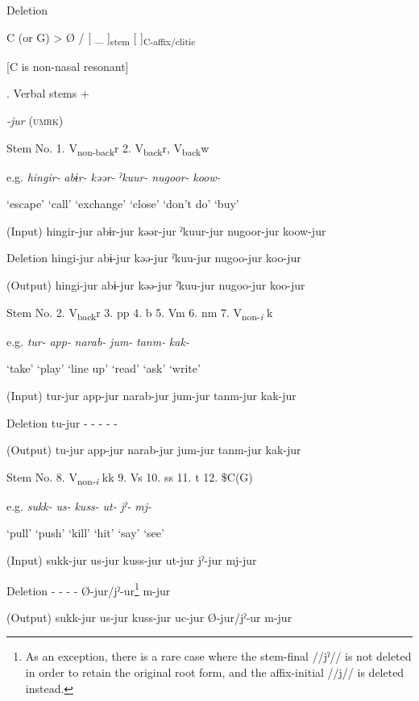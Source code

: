 \ea\label{ex:8-14}
  Deletion

  C (or G)  >  Ø  /  [   \_ ]\textsubscript{stem}  [   ]\textsubscript{C-affix/clitic}

  [C is non-nasal resonant]
\z

\begin{table}
\caption{\label{tab:key:62}. Verbal stems +} \textmd{\textit{{}-jur}}\textmd{ (\textsc{umrk})}

Stem No.  1. V\textsubscript{non-back}r  2. V\textsubscript{back}r, V\textsubscript{back}w

e.g.  \textit{hingir-}  \textit{abɨr-}  \textit{kəər-}  \textit{ˀkuur-}  \textit{nugoor-}  \textit{koow-}

  ‘escape’  ‘call’  ‘exchange’  ‘close’  ‘don’t do’  ‘buy’

(Input)  hingir-jur  abɨr-jur  kəər-jur  ˀkuur-jur  nugoor-jur  koow-jur

Deletion  hingi-jur  abɨ-jur  kəə-jur  ˀkuu-jur  nugoo-jur  koo-jur

(Output)  hingi-jur  abɨ-jur  kəə-jur  ˀkuu-jur  nugoo-jur  koo-jur

Stem No.  2. V\textsubscript{back}r  3. pp  4. b  5. Vm  6. nm  7. V\textsubscript{non-}\textit{\textsubscript{i} }k

e.g.  \textit{tur-}  \textit{app-}  \textit{narab-}  \textit{jum-}  \textit{tanm-}  \textit{kak-}

  ‘take’  ‘play’  ‘line up’  ‘read’  ‘ask’  ‘write’

(Input)  tur-jur  app-jur  narab-jur  jum-jur  tanm-jur  kak-jur

Deletion  tu-jur  {}-  {}-  {}-  {}-  {}-

(Output)  tu-jur  app-jur  narab-jur  jum-jur  tanm-jur  kak-jur

Stem No.  8. V\textsubscript{non-}\textit{\textsubscript{i} }kk  9. Vs  10. ss  11. t  12. \$C(G)

e.g.  \textit{sukk-}  \textit{us-}  \textit{kuss-}  \textit{ut-}  \textit{jˀ-}  \textit{mj-}

  ‘pull’  ‘push’  ‘kill’  ‘hit’  ‘say’  ‘see’

(Input)  sukk-jur  us-jur  kuss-jur  ut-jur  jˀ-jur  mj-jur

Deletion  {}-  {}-  {}-  {}-  Ø-jur/jˀ-ur\footnote{As an exception, there is a rare case where the stem-final //jˀ// is not deleted in order to retain the original root form, and the affix-initial //j// is deleted instead.}  m-jur

(Output)  sukk-jur  us-jur  kuss-jur  uc{}-jur  Ø-jur/jˀ-ur  m-jur


\end{table}
